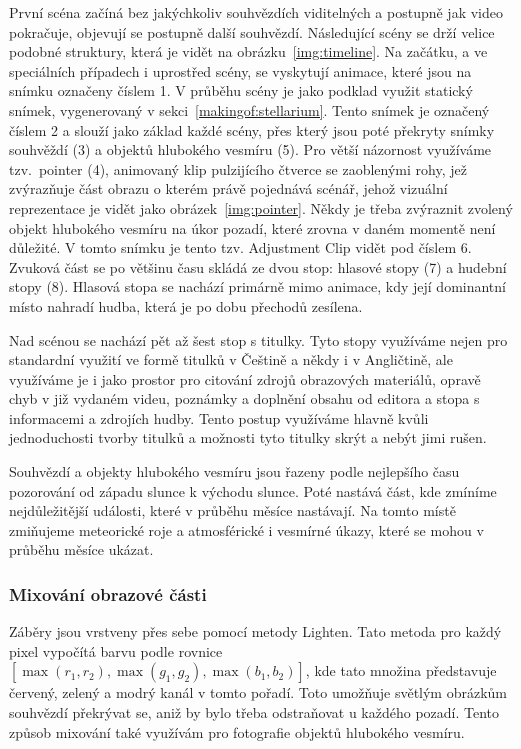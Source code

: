 \documentclass[12pt,a4paper,titlepage]{article}
\begin{document}
První scéna začíná bez jakýchkoliv souhvězdích viditelných a postupně jak video pokračuje, objevují se postupně další souhvězdí. Následující scény se drží velice podobné struktury, která je vidět na obrázku~\ref{img:timeline}. Na začátku, a ve speciálních případech i uprostřed scény, se vyskytují animace, které jsou na snímku označeny číslem 1. V průběhu scény je jako podklad využit statický snímek, vygenerovaný v sekci~\ref{makingof:stellarium}. Tento snímek je označený číslem 2 a slouží jako základ každé scény, přes který jsou poté překryty snímky souhvěždí (3) a objektů hlubokého vesmíru (5). Pro větší názornost využíváme tzv.\ pointer (4), animovaný klip pulzijícího čtverce se zaoblenými rohy, jež zvýrazňuje část obrazu o kterém právě pojednává scénář, jehož vizuální reprezentace je vidět jako obrázek~\ref{img:pointer}. Někdy je třeba zvýraznit zvolený objekt hlubokého vesmíru na úkor pozadí, které zrovna v daném momentě není důležité. V tomto snímku je tento tzv. Adjustment Clip vidět pod číslem 6. Zvuková část se po většinu času skládá ze dvou stop: hlasové stopy (7) a hudební stopy (8). Hlasová stopa se nachází primárně mimo animace, kdy její dominantní místo nahradí hudba, která je po dobu přechodů zesílena.

Nad scénou se nachází pět až šest stop s titulky. Tyto stopy využíváme nejen pro standardní využití ve formě titulků v Češtině a někdy i v Angličtině, ale využíváme je i jako prostor pro citování zdrojů obrazových materiálů, opravě chyb v již vydaném videu, poznámky a doplnění obsahu od editora a stopa s informacemi a zdrojích hudby. Tento postup využíváme hlavně kvůli jednoduchosti tvorby titulků a možnosti tyto titulky skrýt a nebýt jimi rušen. 

Souhvězdí a objekty hlubokého vesmíru jsou řazeny podle nejlepšího času pozorování od západu slunce k východu slunce. Poté nastává část, kde zmíníme nejdůležitější události, které v průběhu měsíce nastávají. Na tomto místě zmiňujeme meteorické roje a atmosférické i vesmírné úkazy, které se mohou v průběhu měsíce ukázat.
\subsubsection{Mixování obrazové části}
Záběry jsou vrstveny přes sebe pomocí metody Lighten. Tato metoda pro každý pixel vypočítá barvu podle rovnice $[\max(r_1, r_2), \max(g_1, g_2), \max(b_1, b_2)]$, kde tato množina představuje červený, zelený a modrý kanál v tomto pořadí. Toto umožňuje světlým obrázkům souhvězdí překrývat se, aniž by bylo třeba odstraňovat u každého pozadí. Tento způsob mixování také využívám pro fotografie objektů hlubokého vesmíru. 
\end{document}

